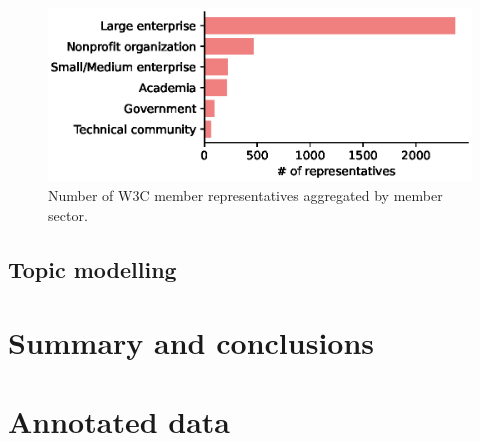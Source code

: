 \documentclass[sigconf, nonacm]{acmart}              %
\begin{document}
\begin{figure}[ht]
  \centering
  \includegraphics[width=1.0\columnwidth]{images/n-reps-per-sector.eps}
  \caption{Number of W3C member representatives aggregated by member sector.}
  \label{fig:reps-per-sector}
\end{figure}

\subsection{Topic modelling}



\section{Summary and conclusions}
\label{sec:conclusions}


%


\balance

\appendix

\section{Annotated data}
\label{sec:annotations}
\end{document}
